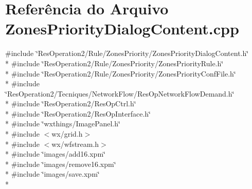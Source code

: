 \section{Referência do Arquivo Zones\+Priority\+Dialog\+Content.\+cpp}
\label{_zones_priority_dialog_content_8cpp}
{\ttfamily \#include \char`\"{}Res\+Operation2/\+Rule/\+Zones\+Priority/\+Zones\+Priority\+Dialog\+Content.\+h\char`\"{}}\\*
{\ttfamily \#include \char`\"{}Res\+Operation2/\+Rule/\+Zones\+Priority/\+Zones\+Priority\+Rule.\+h\char`\"{}}\\*
{\ttfamily \#include \char`\"{}Res\+Operation2/\+Rule/\+Zones\+Priority/\+Zones\+Priority\+Conf\+File.\+h\char`\"{}}\\*
{\ttfamily \#include \char`\"{}Res\+Operation2/\+Tecniques/\+Network\+Flow/\+Res\+Op\+Network\+Flow\+Demand.\+h\char`\"{}}\\*
{\ttfamily \#include \char`\"{}Res\+Operation2/\+Res\+Op\+Ctrl.\+h\char`\"{}}\\*
{\ttfamily \#include \char`\"{}Res\+Operation2/\+Res\+Op\+Interface.\+h\char`\"{}}\\*
{\ttfamily \#include \char`\"{}wxthings/\+Image\+Panel.\+h\char`\"{}}\\*
{\ttfamily \#include $<$wx/grid.\+h$>$}\\*
{\ttfamily \#include $<$wx/wfstream.\+h$>$}\\*
{\ttfamily \#include \char`\"{}images/add16.\+xpm\char`\"{}}\\*
{\ttfamily \#include \char`\"{}images/remove16.\+xpm\char`\"{}}\\*
{\ttfamily \#include \char`\"{}images/save.\+xpm\char`\"{}}\\*
